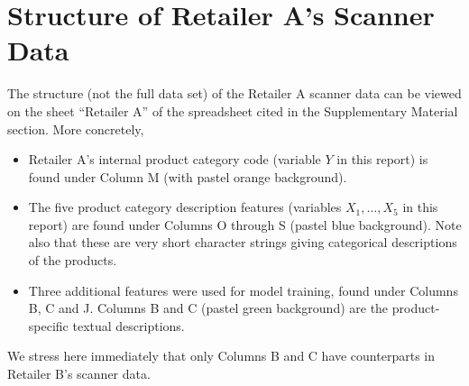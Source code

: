 
\section{Structure of Retailer A's Scanner Data}
\setcounter{theorem}{0}
\setcounter{equation}{0}



The structure (not the full data set) of the Retailer A scanner data can be
viewed on the sheet ``Retailer A'' of the spreadsheet cited in the
Supplementary Material section.
More concretely,
\begin{itemize}
\item
	Retailer A's internal product category code (variable $Y$ in this report)
	is found under Column M (with pastel orange background).
\item
	The five product category description features (variables $X_{1}, \ldots, X_{5}$
	in this report) are found under Columns O through S (pastel blue background).
	Note also that these are very short character strings giving categorical
	descriptions of the products. 
\item
	Three additional features were used for model training, found under
	Columns B, C and J.
	Columns B and C (pastel green background) are the product-specific
	textual descriptions.
\end{itemize}
We stress here immediately that only Columns B and C have counterparts in
Retailer B's scanner data. 

